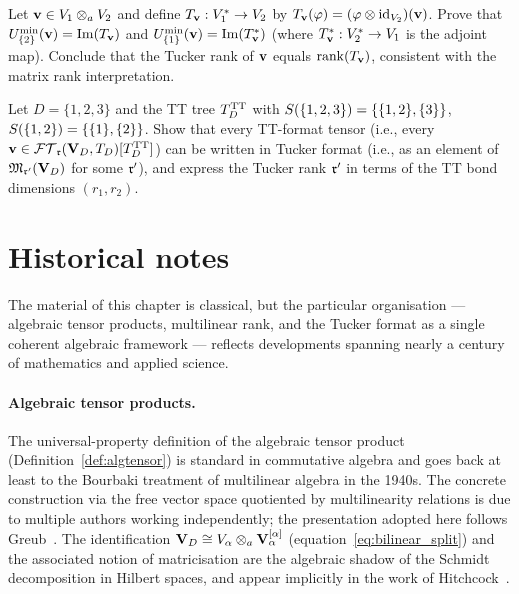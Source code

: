 \begin{exercise}
Let $\mathbf{v} \in V_1 \otimes_a V_2$ and define $T_{\mathbf{v}}: V_1^* \to V_2$ by
$T_{\mathbf{v}}(\varphi) = (\varphi \otimes \mathrm{id}_{V_2})(\mathbf{v})$.
Prove that $U^{\min}_{\{2\}}(\mathbf{v}) = \mathrm{Im}(T_{\mathbf{v}})$ and
$U^{\min}_{\{1\}}(\mathbf{v}) = \mathrm{Im}(T_{\mathbf{v}}^*)$ (where $T_{\mathbf{v}}^*: V_2^*
\to V_1$ is the adjoint map). Conclude that the Tucker rank of $\mathbf{v}$
equals $\mathrm{rank}(T_{\mathbf{v}})$, consistent with the matrix rank
interpretation.
\end{exercise}

\begin{exercise}[Tucker format and the TT format for $d=3$]
Let $D = \{1,2,3\}$ and the TT tree $T_D^{\mathrm{TT}}$ with
$S(\{1,2,3\}) = \{\{1,2\}, \{3\}\}$,
$S(\{1,2\}) = \{\{1\}, \{2\}\}$.
Show that every TT-format tensor (i.e., every $\mathbf{v} \in
\mathcal{FT}_{\mathfrak{r}}(\mathbf{V}_D,T_D)[T_D^{\mathrm{TT}}]$) can be written in Tucker format (i.e., as an element
of $\mathfrak{M}_{\mathfrak{r}'}(\mathbf{V}_D)$ for some $\mathfrak{r}'$), and express the Tucker
rank $\mathfrak{r}'$ in terms of the TT bond dimensions $(r_1, r_2)$.
\end{exercise}

\section{Historical notes}
\label{sec:algtensor:history}

The material of this chapter is classical, but the particular organisation
— algebraic tensor products, multilinear rank, and the Tucker format as
a single coherent algebraic framework — reflects developments spanning
nearly a century of mathematics and applied science.

\paragraph{Algebraic tensor products.}
The universal-property definition of the algebraic tensor product
(Definition~\ref{def:algtensor}) is standard in commutative algebra and
goes back at least to the Bourbaki treatment of multilinear algebra
in the 1940s. The concrete construction via the free vector space
quotiented by multilinearity relations is due to multiple authors working
independently; the presentation adopted here follows
Greub~\cite{Greub1981}. The identification $\mathbf{V}_D \cong V_\alpha \otimes_a
\mathbf{V}_\alpha^{[\alpha]}$ (equation~\eqref{eq:bilinear_split}) and the
associated notion of matricisation are the algebraic shadow of the
Schmidt decomposition in Hilbert spaces, and appear implicitly in the
work of Hitchcock~\cite{Hitchcock1927}.

